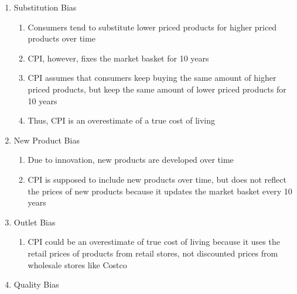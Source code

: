 \documentclass[12pt]{article}
\begin{document}
\begin{enumerate}
\begin{enumerate}
          \item Substitution Bias

            \begin{enumerate}

              \item Consumers tend to substitute lower priced products for higher priced products over time

              \item CPI, however, fixes the market basket for 10 years

              \item CPI assumes that consumers keep buying the same amount of higher priced products, but keep the same amount of lower priced products for 10 years

              \item Thus, CPI is an overestimate of a true cost of living

            \end{enumerate}

          \item New Product Bias

            \begin{enumerate}

              \item Due to innovation, new products are developed over time

              \item CPI is supposed to include new products over time, but does not reflect the prices of new products because it updates the market basket every 10 years

            \end{enumerate}

          \item Outlet Bias

            \begin{enumerate}

              \item CPI could be an overestimate of true cost of living because it uses the retail prices of products from retail stores, not discounted prices from wholesale stores like Costco

            \end{enumerate}

          \item Quality Bias

            \begin{enumerate}


\end{enumerate}
\end{enumerate}
\end{enumerate}
\end{document}
